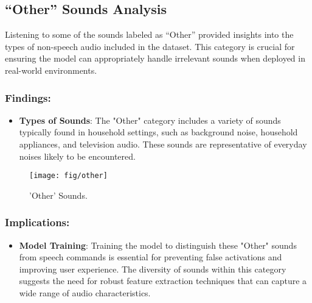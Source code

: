 \subsection{``Other'' Sounds Analysis}

Listening to some of the sounds labeled as “Other” provided insights into the types of non-speech audio included in the dataset. This category is crucial for ensuring the model can appropriately handle irrelevant sounds when deployed in real-world environments.

\subsubsection{Findings:}

\begin{itemize}
    \item \textbf{Types of Sounds}: The "Other" category includes a variety of sounds typically found in household settings, such as background noise, household appliances, and television audio. These sounds are representative of everyday noises likely to be encountered.
\end{itemize}

\begin{figure}[!ht]
	\centering
	\texttt{[image: fig/other]}
	\vspace{-0.3cm}
	\caption{'Other' Sounds.}
	\label{fig:Other}
	\vspace{-0.1cm}
\end{figure}

\subsubsection{Implications:}

\begin{itemize}
    \item \textbf{Model Training}: Training the model to distinguish these "Other" sounds from speech commands is essential for preventing false activations and improving user experience. The diversity of sounds within this category suggests the need for robust feature extraction techniques that can capture a wide range of audio characteristics.
\end{itemize}
